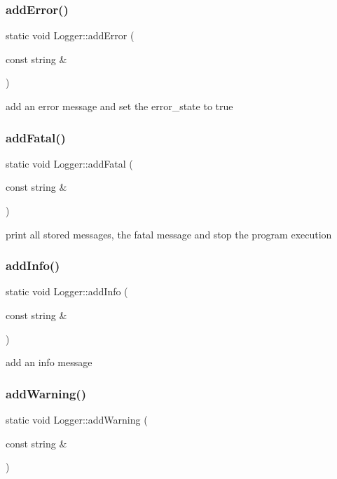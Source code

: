 \subsubsection{\texorpdfstring{add\+Error()}{addError()}}
{\footnotesize\ttfamily static void Logger\+::add\+Error (\begin{DoxyParamCaption}\item[{const string \&}]{ }\end{DoxyParamCaption})\hspace{0.3cm}{\ttfamily [static]}}

add an error message and set the error\+\_\+state to true \mbox{\label{classLogger_a45bc045e4a10a572eb678ff4790f7406}} 
\subsubsection{\texorpdfstring{add\+Fatal()}{addFatal()}}
{\footnotesize\ttfamily static void Logger\+::add\+Fatal (\begin{DoxyParamCaption}\item[{const string \&}]{ }\end{DoxyParamCaption})\hspace{0.3cm}{\ttfamily [static]}}

print all stored messages, the fatal message and stop the program execution \mbox{\label{classLogger_a120908976176ae4ccbca24637014b210}} 
\subsubsection{\texorpdfstring{add\+Info()}{addInfo()}}
{\footnotesize\ttfamily static void Logger\+::add\+Info (\begin{DoxyParamCaption}\item[{const string \&}]{ }\end{DoxyParamCaption})\hspace{0.3cm}{\ttfamily [static]}}

add an info message \mbox{\label{classLogger_a3f763ca60b87026d16e0df8b84b61ffd}} 
\subsubsection{\texorpdfstring{add\+Warning()}{addWarning()}}
{\footnotesize\ttfamily static void Logger\+::add\+Warning (\begin{DoxyParamCaption}\item[{const string \&}]{ }\end{DoxyParamCaption})\hspace{0.3cm}{\ttfamily [static]}}

